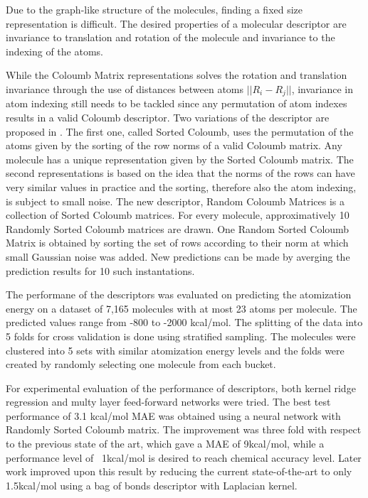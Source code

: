 \documentclass[10pt,journal,a4paper]{IEEEtran}
\begin{document}
Due to the graph-like structure of the molecules, finding a fixed size representation is difficult. The desired properties of a molecular descriptor are invariance to translation and rotation of the molecule and invariance to the indexing of the atoms.

While the Coloumb Matrix representations solves the rotation and translation invariance through the use of distances between atoms $||R_i -R_j||$, invariance in atom indexing still needs to be tackled since any permutation of atom indexes results in a valid Coloumb descriptor.
Two variations of the descriptor are proposed in \cite{montavon2012learning}. The first one, called Sorted Coloumb, uses the permutation of the atoms given by the sorting of the row norms of a valid Coloumb matrix. Any molecule has a unique representation given by the Sorted Coloumb matrix. The second representations is based on the idea that the norms of the rows can have very similar values in practice and the sorting, therefore also the atom indexing, is subject to small noise. The new descriptor, Random Coloumb Matrices is a collection of Sorted Coloumb matrices. For every molecule, approximatively 10 Randomly Sorted Coloumb matrices are drawn. One Random Sorted Coloumb Matrix is obtained by sorting the set of  rows according to their norm at which small Gaussian noise was added. New predictions can be made by averging the prediction results for 10 such instantations.

The performane of the descriptors was evaluated on predicting the atomization energy on a dataset of 7,165 molecules with at most 23 atoms per molecule. The predicted values range from -800 to -2000 kcal/mol. The splitting of the data into 5 folds for cross validation is done using stratified sampling. The molecules were clustered into 5 sets with similar atomization energy levels and the folds were created by randomly selecting one molecule from each bucket.

For experimental evaluation of the performance of descriptors, both kernel ridge regression and multy layer feed-forward networks were tried. The best test performance of 3.1 kcal/mol MAE was obtained using a neural network with
 Randomly Sorted Coloumb matrix. The improvement was three fold with respect to the previous state of the art, which gave a MAE of 9kcal/mol, while a performance level of ~1kcal/mol is desired to reach chemical accuracy level.
Later work \cite{bob} improved upon this result by reducing the current state-of-the-art to only 1.5kcal/mol using a bag of bonds descriptor with Laplacian kernel.
\end{document}
